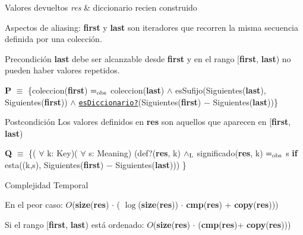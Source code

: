 \begin{DoxyRetVals}{Valores devueltos}
{\em res} & diccionario recien construido\\
\hline
\end{DoxyRetVals}
\begin{DoxyParagraph}{Aspectos de aliasing\+:}
{\bfseries first} y {\bfseries last} son iteradores que recorren la misma secuencia definida por una colección.
\end{DoxyParagraph}
\begin{DoxyPrecond}{Precondición}
{\bfseries last} debe ser alcanzable desde {\bfseries first} y en el rango \mbox{[}{\bfseries first}, {\bfseries last}) no pueden haber valores repetidos.

{\bfseries P} $\equiv$ \{coleccion({\bfseries first}) $=_{\rm obs}$ coleccion({\bfseries last}) $\land$ es\+Sufijo(Siguientes({\bfseries last}), Siguientes({\bfseries first})) $\land$ \href{axiomas.html#esDiccionario?}{\tt es\+Diccionario?}(Siguientes({\bfseries first}) $-$ Siguientes({\bfseries last}))\} 
\end{DoxyPrecond}


\begin{DoxyPostcond}{Postcondición}
Los valores definidos en {\bfseries res} son aquellos que aparecen en \mbox{[}{\bfseries first}, {\bfseries last})

{\bfseries Q} $\equiv$ \{( $\forall$ k\+: Key)( $\forall$ s\+: Meaning) (def?({\bfseries res}, k) $\land_{\rm L}$ significado({\bfseries res}, k) $=_{\rm obs}$ s {\bfseries if} esta((k,s), Siguientes({\bfseries first}) $-$ Siguientes({\bfseries last}))) \} 
\end{DoxyPostcond}



\begin{DoxyDescription}
\item[Complejidad Temporal]
\begin{DoxyItemize}
\item En el peor caso\+: $O$({\bfseries size}({\bfseries res}) $\cdot$ ( $\log$({\bfseries size}({\bfseries res})) $\cdot$ {\bfseries cmp}({\bfseries res}) + {\bfseries copy}({\bfseries res})))
\item Si el rango \mbox{[}{\bfseries first}, {\bfseries last}) está ordenado\+: $O$({\bfseries size}({\bfseries res}) $\cdot$ ({\bfseries cmp}({\bfseries res})+ {\bfseries copy}({\bfseries res}))) 
\end{DoxyItemize}
\end{DoxyDescription}

